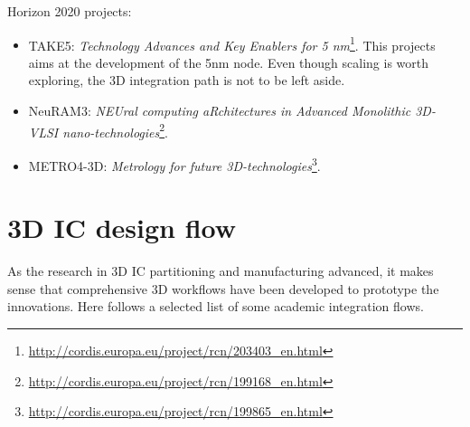 \documentclass[11pt,a4paper]{report} %
\theoremstyle{customdef}
\begin{document}
Horizon 2020 projects:
\begin{itemize}
	\item TAKE5: \textit{Technology Advances and Key Enablers for 5 nm}\footnote{\url{http://cordis.europa.eu/project/rcn/203403_en.html}}. This projects aims at the development of the 5nm node. Even though scaling is worth exploring, the 3D integration path is not to be left aside.
	\item NeuRAM3: \textit{NEUral computing aRchitectures in Advanced Monolithic 3D-VLSI nano-technologies}\footnote{\url{http://cordis.europa.eu/project/rcn/199168_en.html}}.
	\item METRO4-3D: \textit{Metrology for future 3D-technologies}\footnote{\url{http://cordis.europa.eu/project/rcn/199865_en.html}}.
\end{itemize}




\section{3D IC design flow}\label{sec:flows}
As the research in 3D IC partitioning and manufacturing advanced, it makes sense that comprehensive 3D workflows have been developed to prototype the innovations.
Here follows a selected list of some academic integration flows.
\end{document}
